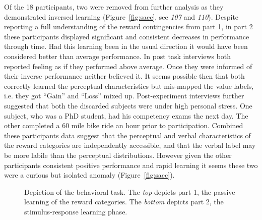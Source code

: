 \documentclass[doc,12pt]{apa}        %
\begin{document}
Of the 18 participants, two were removed from further analysis as they demonstrated inversed learning (Figure~\ref{fig:sacc}, see \emph{107} and \emph{110}).  Despite reporting a full understanding of the reward contingencies from part 1, in part 2 these participants displayed significant and consistent decreases in performance through time.  Had this learning been in the usual direction it would have been considered better than average performance.  In post task interviews both reported feeling as if they performed above average.  Once they were informed of their inverse performance neither believed it.  It seems possible then that both correctly learned the perceptual characteristics but mis-mapped the value labels, i.e. they got ``Gain'' and ``Loss''  mixed up.  Post-experiment interviews further suggested that both the discarded subjects were under high personal stress.  One subject, who was a PhD student, had his competency exams the next day.  The other completed a 60 mile bike ride an hour prior to participation.  Combined these participants data suggest that the perceptual and verbal characteristics of the reward categories are independently accessible, and that the verbal label may be more labile than the perceptual distributions.  However given the other participants consistent positive performance and rapid learning it seems these two were a curious but isolated anomaly (Figure~\ref{fig:sacc}).

\begin{figure}[tp]
    \centering
    \caption{Depiction of the behavioral task.  The \emph{top} depicts part 1, the passive learning of the reward categories.  The \emph{bottom} depicts part 2, the stimulus-response learning phase.}
	\label{fig:task}
\end{figure}
\end{document}
